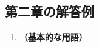 \documentclass[uplatex,dvipdfmx,a4paper,11pt]{jsarticle}
\newcommand{\diff}{\mathrm d}
\begin{document}
\begin{appendix}
\begin{enumerate}
%
%
%
%
%
%
%
%
%
%
%
%

\end{enumerate}

\newpage

\subsection{第二章の解答例}


\begin{enumerate}
\item
{\bf （基本的な用語）}


\end{enumerate}
\end{appendix}
\end{document}
